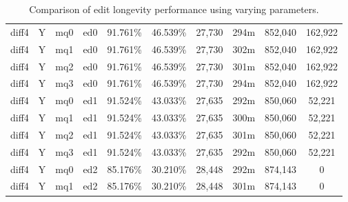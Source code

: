 \begin{sidewaystable}[!tp]
\begin{center}
\begin{tabular}{|c|c|c|c||c|c||c|c|c|c|}
diff4 & Y & mq0 & ed0 & 91.761\% & 46.539\% & 27,730 & 294m & 852,040 & 162,922 \\
diff4 & Y & mq1 & ed0 & 91.761\% & 46.539\% & 27,730 & 302m & 852,040 & 162,922 \\
diff4 & Y & mq2 & ed0 & 91.761\% & 46.539\% & 27,730 & 301m & 852,040 & 162,922 \\
diff4 & Y & mq3 & ed0 & 91.761\% & 46.539\% & 27,730 & 294m & 852,040 & 162,922 \\
diff4 & Y & mq0 & ed1 & 91.524\% & 43.033\% & 27,635 & 292m & 850,060 & 52,221 \\
diff4 & Y & mq1 & ed1 & 91.524\% & 43.033\% & 27,635 & 300m & 850,060 & 52,221 \\
diff4 & Y & mq2 & ed1 & 91.524\% & 43.033\% & 27,635 & 301m & 850,060 & 52,221 \\
diff4 & Y & mq3 & ed1 & 91.524\% & 43.033\% & 27,635 & 292m & 850,060 & 52,221 \\
diff4 & Y & mq0 & ed2 & 85.176\% & 30.210\% & 28,448 & 292m & 874,143 & 0 \\
diff4 & Y & mq1 & ed2 & 85.176\% & 30.210\% & 28,448 & 301m & 874,143 & 0 \\
\hline
\end{tabular}
\end{center}
\caption{Comparison of edit longevity performance using
    varying parameters.}
\end{sidewaystable}

